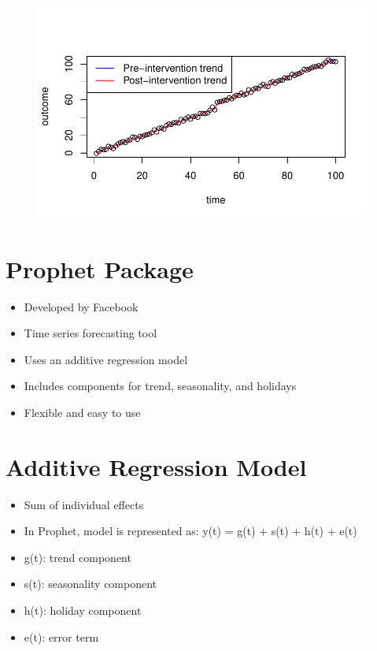 \documentclass[
  letterpaper,
  DIV=11,
  numbers=noendperiod]{scrartcl}
\providecommand{\tightlist}{%
  \setlength{\itemsep}{0pt}\setlength{\parskip}{0pt}}\usepackage{longtable,booktabs,array}
\begin{document}
\begin{figure}[H]

{\centering \includegraphics{ts_files/figure-pdf/unnamed-chunk-1-1.pdf}

}

\end{figure}

\hypertarget{prophet-package}{%
\section{Prophet Package}\label{prophet-package}}

\begin{itemize}
\tightlist
\item
  Developed by Facebook
\item
  Time series forecasting tool
\item
  Uses an additive regression model
\item
  Includes components for trend, seasonality, and holidays
\item
  Flexible and easy to use
\end{itemize}

\hypertarget{additive-regression-model}{%
\section{Additive Regression Model}\label{additive-regression-model}}

\begin{itemize}
\tightlist
\item
  Sum of individual effects
\item
  In Prophet, model is represented as: y(t) = g(t) + s(t) + h(t) + e(t)
\item
  g(t): trend component
\item
  s(t): seasonality component
\item
  h(t): holiday component
\item
  e(t): error term
\end{itemize}
\end{document}
